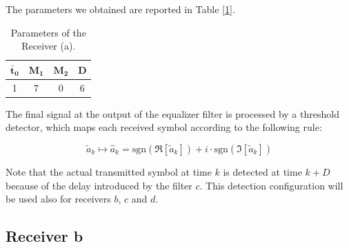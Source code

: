\documentclass[a4paper, 12pt]{report}
\begin{document}
The parameters we obtained are reported in Table [\ref{Tab_a}].

\begin{table}[H]
	\centering
	\begin{tabular}{c c c c}
		\toprule
		$\mathbf{\bar{t}_0}$ & $\mathbf{M_1}$ & $\mathbf{M_2}$ & \textbf{D}     \\
		\midrule
		1 & 7 & 0 & 6 \\
		\bottomrule			
	\end{tabular}
	\caption{Parameters of the Receiver (a).}
	\label{Tab_a}
\end{table}

The final signal at the output of the equalizer filter is processed by a threshold detector, which maps each received symbol according to the following rule:

\begin{equation*}
\tilde{a}_k \mapsto \hat{a}_k = \text{sgn}(\Re[\tilde{a}_k ]) +i \cdot \text{sgn}(\Im[\tilde{a}_k ])
\end{equation*}
 
Note that the actual transmitted symbol at time $k$ is detected at time $k+D$ because of the delay introduced by the filter $c$. This detection configuration will be used also for receivers $b$, $c$ and $d$. 

\clearpage
\subsection*{Receiver b}
\end{document}
